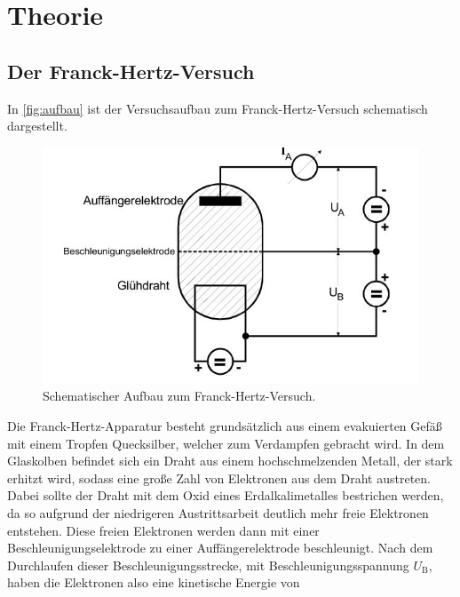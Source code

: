 \section{Theorie}
\label{sec:Theorie}
\subsection{Der Franck-Hertz-Versuch}
In \autoref{fig:aufbau} ist der Versuchsaufbau zum Franck-Hertz-Versuch schematisch dargestellt.

\begin{figure}[H]
    \centering
    \includegraphics[width=\textwidth]{images/aufbau1.JPG}
    \caption{Schematischer Aufbau zum Franck-Hertz-Versuch. \cite{V601}}
    \label{fig:aufbau}
  \end{figure}
\noindent
Die Franck-Hertz-Apparatur besteht grundsätzlich aus einem evakuierten Gefäß mit einem Tropfen Quecksilber, welcher zum Verdampfen gebracht wird. In dem Glaskolben befindet sich ein Draht aus einem hochschmelzenden Metall, der stark erhitzt wird, sodass eine große Zahl von Elektronen aus dem Draht austreten. Dabei sollte der Draht mit dem Oxid eines Erdalkalimetalles bestrichen werden, da so aufgrund der niedrigeren Austrittsarbeit deutlich mehr freie Elektronen entstehen. Diese freien Elektronen werden dann mit einer Beschleunigungselektrode zu einer Auffängerelektrode beschleunigt. Nach dem Durchlaufen dieser Beschleunigungsstrecke, mit Beschleunigungsspannung $U_\text{B}$, haben die Elektronen also eine kinetische Energie von 

